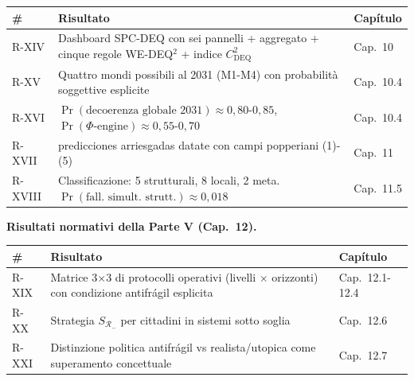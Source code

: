 {\def\LTcaptype{none} %
{\small\begin{longtable}[]{@{}
  >{\raggedright\arraybackslash}p{}
  >{\raggedright\arraybackslash}p{}
  >{\raggedright\arraybackslash}p{}@{}}
\toprule\noalign{}
\begin{minipage}[b]{\linewidth}\raggedright
\#
\end{minipage} & \begin{minipage}[b]{\linewidth}\raggedright
Risultato
\end{minipage} & \begin{minipage}[b]{\linewidth}\raggedright
Capítulo
\end{minipage} \\
\midrule\noalign{}
\endhead
\bottomrule\noalign{}
\endlastfoot
R-XIV & Dashboard SPC-DEQ con sei pannelli + aggregato + cinque regole
WE-DEQ$^2$ + indice \(C_{\text{DEQ}}^2\) & Cap.~10 \\
R-XV & Quattro mondi possibili al 2031 (M1-M4) con probabilità
soggettive esplicite & Cap.~10.4 \\
R-XVI &
\(\Pr(\text{decoerenza globale 2031}) \approx 0{,}80\)-\(0{,}85\),
\(\Pr(\Phi\text{-engine}) \approx 0{,}55\)-\(0{,}70\) & Cap.~10.4 \\
R-XVII & 16 predicciones arriesgadas datate con campi popperiani (1)-(5) &
Cap.~11 \\
R-XVIII & Classificazione: 5 strutturali, 8 locali, 2 meta.
\(\Pr(\text{fall. simult. strutt.}) \approx 0{,}018\) & Cap.~11.5 \\
\end{longtable}}
}

\Proved{} \textbf{Risultati normativi della Parte V (Cap.~12).}

{\def\LTcaptype{none} %
{\small\begin{longtable}[]{@{}
  >{\raggedright\arraybackslash}p{}
  >{\raggedright\arraybackslash}p{}
  >{\raggedright\arraybackslash}p{}@{}}
\toprule\noalign{}
\begin{minipage}[b]{\linewidth}\raggedright
\#
\end{minipage} & \begin{minipage}[b]{\linewidth}\raggedright
Risultato
\end{minipage} & \begin{minipage}[b]{\linewidth}\raggedright
Capítulo
\end{minipage} \\
\midrule\noalign{}
\endhead
\bottomrule\noalign{}
\endlastfoot
R-XIX & Matrice 3$\times$3 di protocolli operativi (livelli $\times$ orizzonti) con
condizione antifrágil esplicita & Cap.~12.1-12.4 \\
R-XX & Strategia \(S_{\mathcal{R}_-}\) per cittadini in sistemi sotto
soglia & Cap.~12.6 \\
R-XXI & Distinzione politica antifrágil vs realista/utopica come
superamento concettuale & Cap.~12.7 \\
\end{longtable}}
}

